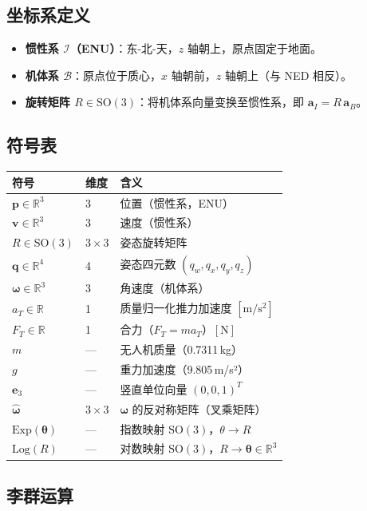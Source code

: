 \documentclass[UTF8, a4paper, 11pt]{ctexart}
\newcommand{\SO}{\mathrm{SO}(3)}
\newcommand{\R}{\mathbb{R}}
\newcommand{\bp}{\mathbf{p}}
\newcommand{\bv}{\mathbf{v}}
\newcommand{\bq}{\mathbf{q}}
\newcommand{\bw}{\boldsymbol{\omega}}
\newcommand{\Log}{\mathrm{Log}}
\newcommand{\Exp}{\mathrm{Exp}}
\newcommand{\hhat}[1]{\widehat{#1}}
\begin{document}
\subsection{坐标系定义}

\begin{itemize}
  \item \textbf{惯性系 $\mathcal{I}$（ENU）}：东-北-天，$z$ 轴朝上，原点固定于地面。
  \item \textbf{机体系 $\mathcal{B}$}：原点位于质心，$x$ 轴朝前，$z$ 轴朝上（与 NED 相反）。
  \item \textbf{旋转矩阵 $R \in \SO$}：将机体系向量变换至惯性系，即 $\mathbf{a}_I = R\,\mathbf{a}_B$。
\end{itemize}

\subsection{符号表}

\begin{center}
\begin{tabular}{lll}
\toprule
符号 & 维度 & 含义 \\
\midrule
$\bp \in \R^3$ & 3 & 位置（惯性系，ENU）\\
$\bv \in \R^3$ & 3 & 速度（惯性系）\\
$R \in \SO$ & $3\times3$ & 姿态旋转矩阵 \\
$\bq \in \R^4$ & 4 & 姿态四元数 $(q_w, q_x, q_y, q_z)$\\
$\bw \in \R^3$ & 3 & 角速度（机体系）\\
$a_T \in \R$ & 1 & 质量归一化推力加速度 $[\mathrm{m/s^2}]$\\
$F_T \in \R$ & 1 & 合力（$F_T = m a_T$）$[\mathrm{N}]$\\
$m$ & — & 无人机质量（0.7311\,kg）\\
$g$ & — & 重力加速度（9.805\,m/s²）\\
$\mathbf{e}_3$ & — & 竖直单位向量 $(0,0,1)^T$\\
$\hhat{\bw}$ & $3\times3$ & $\bw$ 的反对称矩阵（叉乘矩阵）\\
$\Exp(\boldsymbol{\theta})$ & — & 指数映射 $\SO$，$\theta\to R$\\
$\Log(R)$ & — & 对数映射 $\SO$，$R\to\boldsymbol{\theta} \in \R^3$\\
\bottomrule
\end{tabular}
\end{center}

\subsection{李群运算}
\end{document}
